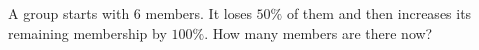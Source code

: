 A group starts with $6$ members. It loses $50\%$ of them and then increases its remaining membership by $100\%$. How many members are there now?
